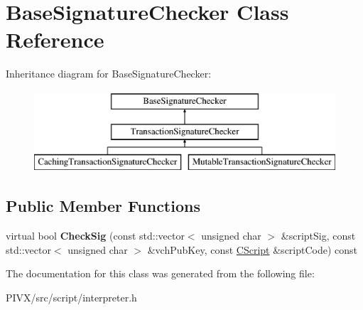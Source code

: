 \hypertarget{class_base_signature_checker}{}\section{Base\+Signature\+Checker Class Reference}
\label{class_base_signature_checker}
Inheritance diagram for Base\+Signature\+Checker\+:\begin{figure}[H]
\begin{center}
\leavevmode
\includegraphics[height=3.000000cm]{class_base_signature_checker}
\end{center}
\end{figure}
\subsection*{Public Member Functions}
\begin{DoxyCompactItemize}
\item 
\mbox{\label{class_base_signature_checker_a1eaaee286e57739edc2a1a1a5bed8352}} 
virtual bool {\bfseries Check\+Sig} (const std\+::vector$<$ unsigned char $>$ \&script\+Sig, const std\+::vector$<$ unsigned char $>$ \&vch\+Pub\+Key, const \mbox{\hyperlink{class_c_script}{C\+Script}} \&script\+Code) const
\end{DoxyCompactItemize}


The documentation for this class was generated from the following file\+:\begin{DoxyCompactItemize}
\item 
P\+I\+V\+X/src/script/interpreter.\+h\end{DoxyCompactItemize}
